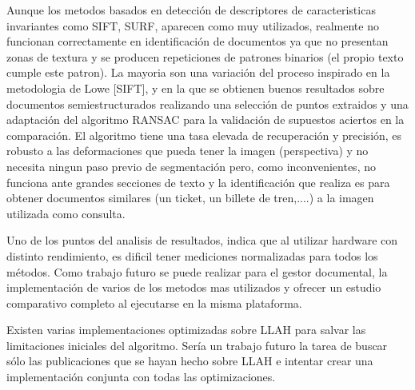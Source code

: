 Aunque los metodos basados en detección de descriptores de caracteristicas invariantes como SIFT, SURF, aparecen como muy utilizados, realmente no funcionan correctamente en identificación de documentos ya que no presentan zonas de textura y se producen repeticiones de patrones binarios (el propio texto cumple este patron). La mayoria son una variación del proceso inspirado en la metodologia de Lowe [SIFT], y en la que se obtienen buenos resultados sobre documentos semiestructurados realizando una selección de puntos extraidos y una adaptación del algoritmo RANSAC para la validación de supuestos aciertos en la comparación. El algoritmo tiene una tasa elevada de recuperación y precisión, es robusto a las deformaciones que pueda tener la imagen (perspectiva) y no necesita ningun paso previo de segmentación pero, como inconvenientes, no funciona ante grandes secciones de texto y la identificación que realiza es para obtener documentos similares (un ticket, un billete de tren,....) a la imagen utilizada como consulta.

Uno de los puntos del analisis de resultados, indica que al utilizar hardware con distinto rendimiento, es dificil tener mediciones normalizadas para todos los métodos. Como trabajo futuro se puede realizar para el gestor documental, la implementación de varios de los metodos mas utilizados y ofrecer un estudio comparativo completo al ejecutarse en la misma plataforma.

Existen varias implementaciones optimizadas sobre LLAH para salvar las limitaciones iniciales del algoritmo. Sería un trabajo futuro la tarea de buscar sólo las publicaciones que se hayan hecho sobre LLAH e intentar crear una implementación conjunta  con todas las optimizaciones. 


